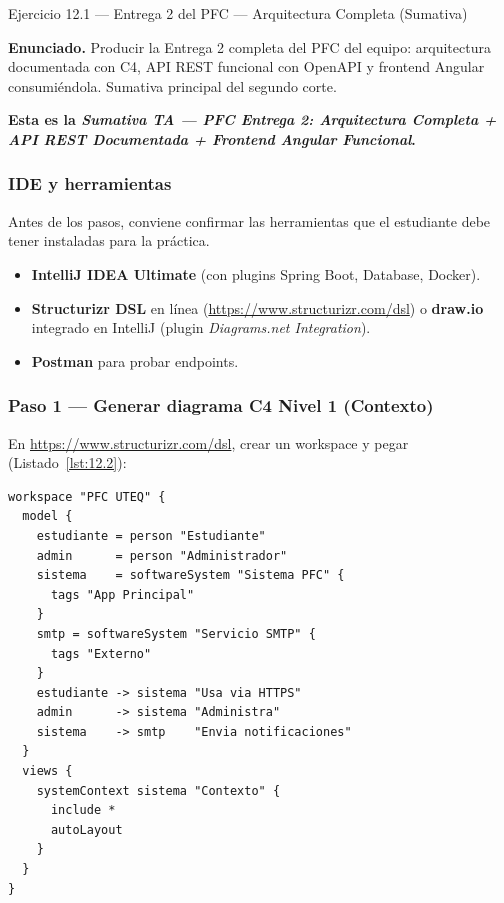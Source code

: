 \documentclass[11pt,a4paper,openany]{book}
\begin{document}
\begin{cajaejercicio}{Ejercicio 12.1 --- Entrega 2 del PFC --- Arquitectura Completa (Sumativa)}


\textbf{Enunciado.} Producir la Entrega 2 completa del PFC del equipo: arquitectura documentada con C4, API REST funcional con OpenAPI y frontend Angular consumiéndola. Sumativa principal del segundo corte.

\textbf{Esta es la \emph{Sumativa TA --- PFC Entrega 2: Arquitectura
Completa + API REST Documentada + Frontend Angular Funcional}.}

\subsubsection*{IDE y herramientas}

Antes de los pasos, conviene confirmar las herramientas que
el estudiante debe tener instaladas para la práctica.


\begin{itemize}
\item \textbf{IntelliJ IDEA Ultimate} (con plugins Spring Boot,
Database, Docker).
\item \textbf{Structurizr DSL} en línea (\url{https://www.structurizr.com/dsl})
o \textbf{draw.io} integrado en IntelliJ
(plugin \emph{Diagrams.net Integration}).
\item \textbf{Postman} para probar endpoints.
\end{itemize}

\subsubsection*{Paso 1 --- Generar diagrama C4 Nivel 1 (Contexto)}

En \url{https://www.structurizr.com/dsl}, crear un workspace y pegar (Listado~\ref{lst:12.2}):

\begin{lstlisting}[style=shell,numbers=none,caption={Ejemplo de Shell},label=lst:12.2]
workspace "PFC UTEQ" {
  model {
    estudiante = person "Estudiante"
    admin      = person "Administrador"
    sistema    = softwareSystem "Sistema PFC" {
      tags "App Principal"
    }
    smtp = softwareSystem "Servicio SMTP" {
      tags "Externo"
    }
    estudiante -> sistema "Usa via HTTPS"
    admin      -> sistema "Administra"
    sistema    -> smtp    "Envia notificaciones"
  }
  views {
    systemContext sistema "Contexto" {
      include *
      autoLayout
    }
  }
}
\end{lstlisting}


\end{cajaejercicio}
\end{document}
